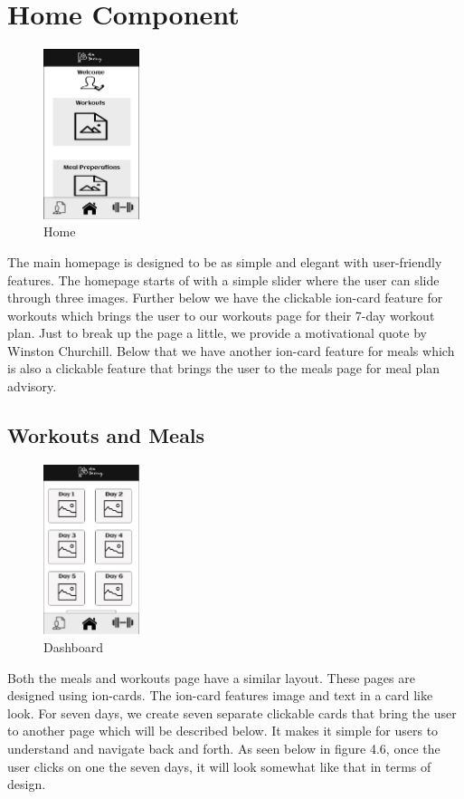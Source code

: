\documentclass[a4paper,12pt]{report}
\begin{document}
\section{Home Component}
\begin{figure}
\centering
\includegraphics[width=0.25\textwidth]{images/homePageBorder.png}
\caption{\label{fig:homepage}Home}
\end{figure}
The main homepage is designed to be as simple and elegant with user-friendly features. The homepage starts of with a simple slider where the user can slide through three images.
Further below we have the clickable ion-card feature for workouts which brings the user to our workouts page for their 7-day workout plan. Just to break up the page a little, we provide a motivational quote by Winston Churchill. Below that we have another ion-card feature for meals which is also a clickable feature that brings the user to the meals page for meal plan advisory.
\\
\newpage
\subsection{Workouts and Meals}
\begin{figure}
\centering
\includegraphics[width=0.25\textwidth]{images/days.png}
\caption{\label{fig:homepage}Dashboard}
\end{figure}
Both the meals and workouts page have a similar layout. These pages are designed using ion-cards. The ion-card features image and text in a card like look. For seven days, we create seven separate clickable cards that bring the user to another page which will be described below. It makes it simple for users to understand and navigate back and forth. As seen below in figure 4.6, once the user clicks on one the seven days, it will look somewhat like that in terms of design.\\\\\\\
\end{document}
